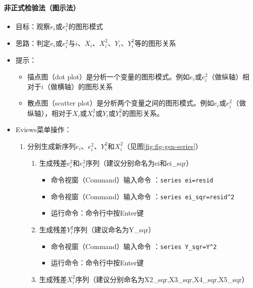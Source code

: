\documentclass[12pt,(landscape,a4paper),(portrait,a4paper)]{article}
\providecommand{\tightlist}{%
  \setlength{\itemsep}{0pt}\setlength{\parskip}{0pt}}
\let\oldparagraph\paragraph
\renewcommand{\paragraph}[1]{\oldparagraph{#1}\mbox{}}
\begin{document}
\paragraph{非正式检验法（图示法）}

\begin{itemize}
\tightlist
\item
  目标：观察\(e_i\)或\(e^2_i\)的图形模式
\item
  思路：判定\(e_i\)或\(e^2_i\)与\(i\)、\(X_i\)、\(X^2_i\)、\(Y_i\)、\(Y^2_i\)等的图形关系
\item
  提示：

  \begin{itemize}
  \tightlist
  \item
    描点图（dot
    plot）是分析一个变量的图形模式。例如\(e_i\)或\(e^2_i\)（做纵轴）相对于\(i\)（做横轴）的图形关系
  \item
    散点图（scatter
    plot）是分析两个变量之间的图形模式。例如\(e_i\)或\(e^2_i\)（做纵轴），相对于\(X_i\)或\(X^2_i\)或\(Y_i\)或\(Y^2_i\)的图形关系。
  \end{itemize}
\item
  Eviews菜单操作：

  \begin{enumerate}
  \def\labelenumi{\arabic{enumi})}
  \tightlist
  \item
    分别生成新序列\(e_i\)、\(e^2_i\)、\(Y^2_i\)和\(X^2_i\)（见图\ref{fig:fig-gen-series}）

    \begin{enumerate}
    \def\labelenumii{\alph{enumii}.}
    \tightlist
    \item
      生成残差\(e^2_i\)和\(e^2_i\)序列（建议分别命名为ei和ei\_sqr）

      \begin{itemize}
      \tightlist
      \item
        命令视窗（Command）输入命令 ：\texttt{series\ ei=resid}
      \item
        命令视窗（Command）输入命令
        ：\texttt{series\ ei\_sqr=resid\^{}2}
      \item
        运行命令：命令行中按Enter键\\
      \end{itemize}
    \item
      生成残差\(Y^2_i\)序列（建议命名为Y\_sqr）

      \begin{itemize}
      \tightlist
      \item
        命令视窗（Command）输入命令 ：\texttt{series\ Y\_sqr=Y\^{}2}
      \item
        运行命令：命令行中按Enter键\\
      \end{itemize}
    \item
      生成残差\(X^2_i\)序列（建议分别命名为X2\_sqr,X3\_sqr,X4\_sqr,X5\_sqr）


\end{enumerate}
\end{enumerate}
\end{itemize}
\end{document}
